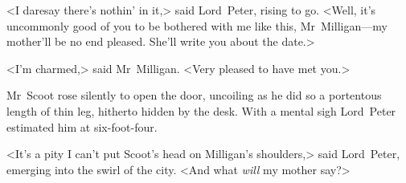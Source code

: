 <I daresay there's nothin' in it,> said Lord~Peter, rising to go. <Well, it's uncommonly good of you to be bothered with me like this, Mr~Milligan—my mother'll be no end pleased. She'll write you about the date.>

<I'm charmed,> said Mr~Milligan. <Very pleased to have met you.>

Mr~Scoot rose silently to open the door, uncoiling as he did so a portentous length of thin leg, hitherto hidden by the desk. With a mental sigh Lord~Peter estimated him at six-foot-four.

<It's a pity I can't put Scoot's head on Milligan's shoulders,> said Lord~Peter, emerging into the swirl of the city. <And what \emph{will} my mother say?>